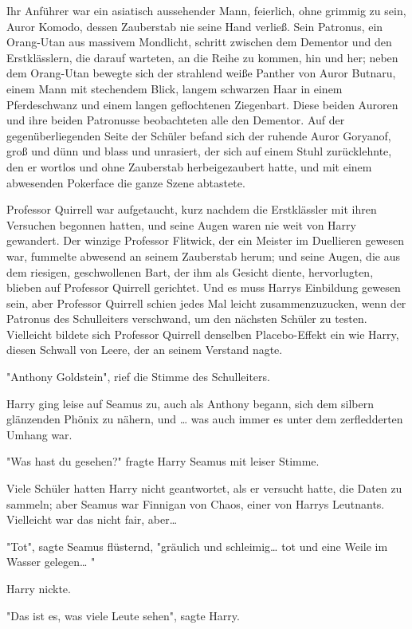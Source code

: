 {Ihr Anführer war ein asiatisch aussehender Mann, feierlich, ohne grimmig zu sein, Auror Komodo, dessen Zauberstab nie seine Hand verließ. Sein Patronus, ein Orang-Utan aus massivem Mondlicht, schritt zwischen dem Dementor und den Erstklässlern, die darauf warteten, an die Reihe zu kommen, hin und her; neben dem Orang-Utan bewegte sich der strahlend weiße Panther von Auror Butnaru, einem Mann mit stechendem Blick, langem schwarzen Haar in einem Pferdeschwanz und einem langen geflochtenen Ziegenbart. Diese beiden Auroren und ihre beiden Patronusse beobachteten alle den Dementor. Auf der gegenüberliegenden Seite der Schüler befand sich der ruhende Auror Goryanof, groß und dünn und blass und unrasiert, der sich auf einem Stuhl zurücklehnte, den er wortlos und ohne Zauberstab herbeigezaubert hatte, und mit einem abwesenden Pokerface die ganze Szene abtastete.

Professor Quirrell war aufgetaucht, kurz nachdem die Erstklässler mit ihren Versuchen begonnen hatten, und seine Augen waren nie weit von Harry gewandert. Der winzige Professor Flitwick, der ein Meister im Duellieren gewesen war, fummelte abwesend an seinem Zauberstab herum; und seine Augen, die aus dem riesigen, geschwollenen Bart, der ihm als Gesicht diente, hervorlugten, blieben auf Professor Quirrell gerichtet. Und es muss Harrys Einbildung gewesen sein, aber Professor Quirrell schien jedes Mal leicht zusammenzuzucken, wenn der Patronus des Schulleiters verschwand, um den nächsten Schüler zu testen. Vielleicht bildete sich Professor Quirrell denselben Placebo-Effekt ein wie Harry, diesen Schwall von Leere, der an seinem Verstand nagte.

"Anthony Goldstein", rief die Stimme des Schulleiters.

Harry ging leise auf Seamus zu, auch als Anthony begann, sich dem silbern glänzenden Phönix zu nähern, und … was auch immer es unter dem zerfledderten Umhang war.

"Was hast du gesehen?" fragte Harry Seamus mit leiser Stimme.

Viele Schüler hatten Harry nicht geantwortet, als er versucht hatte, die Daten zu sammeln; aber Seamus war Finnigan von Chaos, einer von Harrys Leutnants. Vielleicht war das nicht fair, aber…

"Tot", sagte Seamus flüsternd, "gräulich und schleimig… tot und eine Weile im Wasser gelegen… "

Harry nickte.

"Das ist es, was viele Leute sehen", sagte Harry.

}
